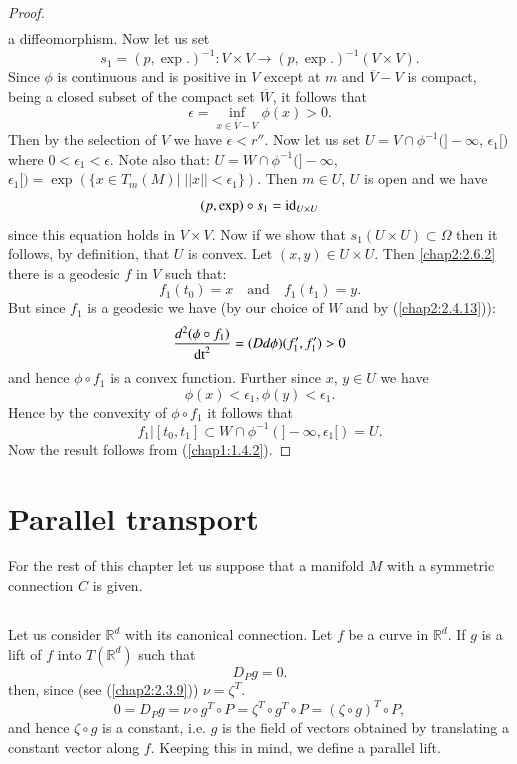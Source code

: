 \begin{proof}
\begin{align*}
\end{align*}
a diffeomorphism. Now let us set
$$
s_{1}=(p,\exp.)^{-1}:V\times V\to (p,\exp.)^{-1}(V\times V).
$$
Since $\phi$ is continuous and is positive in $V$ except at $m$ and
$\overline{V}-V$ is compact, being a closed subset of the compact set
$\overline{W}$, it follows that
$$
\epsilon=\inf_{x\in\overline{V}-V}\phi(x)>0.
$$
Then by the selection of $V$ we have $\epsilon<r''$. Now let us set
$U=V\cap \phi^{-1}(]-\infty$, $\epsilon_{1}[)$ where
    $0<\epsilon_{1}<\epsilon$. Note also that: $U=W\cap
    \phi^{-1}(]-\infty$, $\epsilon_{1}[)=\exp(\{x\in T_{m}(M)\big|\;
    ||x||<\epsilon_{1}\})$. Then $m\in U$, $U$ is open and we have
$$
(p,\exp)\circ s_{1}=\operatorname{id}_{U\times U}
$$
since \pageoriginale this equation holds in $V\times V$. Now if we show
that $s_{1}(U\times U)\subset \Omega$ then it follows, by definition,
that $U$ is convex. Let $(x,y)\in U\times U$. Then \ref{chap2:2.6.2} there
is a geodesic $f$ in $V$ such that:
$$
f_{1}(t_{0})=x\quad\text{and}\quad f_{1}(t_{1})=y.
$$
But since $f_{1}$ is a geodesic we have (by our choice of $W$ and by
(\ref{chap2:2.4.13})): 
$$
\dfrac{d^{2}(\phi\circ f_{1})}{\operatorname{dt}^{2}}=(Dd\phi)(f'_{1},f'_{1})>0
$$
and hence $\phi\circ f_{1}$ is a convex function. Further since $x$,
$y\in U$ we have
$$
\phi(x)<\epsilon_{1}, \phi(y)<\epsilon_{1}.
$$
Hence by the convexity of $\phi\circ f_{1}$ it follows that
$$
f_{1}\big|[t_{0},t_{1}]\subset W\cap
\phi^{-1}(]-\infty,\epsilon_{1}[)=U.
$$
Now the result follows from (\ref{chap1:1.4.2}).
\end{proof}

\section{Parallel transport}\label{chap2:sec7}

For the rest of this chapter let us suppose that a manifold $M$ with a
symmetric connection $C$ is given.

\subsection{}\label{chap2:exam2.7.1}


\begin{example*}
Let us consider $\mathbb{R}^{d}$ with its canonical connection. Let
$f$ be a curve in $\mathbb{R}^{d}$. If $g$ is a lift of $f$ into
$T(\mathbb{R}^{d})$ such that
$$
D_{P}g=0.
$$
then, \pageoriginale since (see (\ref{chap2:2.3.9})) $\nu=\zeta^{T}$.
$$
0=D_{P}g=\nu\circ g^{T}\circ P=\zeta^{T}\circ g^{T}\circ P=(\zeta\circ
g)^{T}\circ P,
$$
and hence $\zeta\circ g$ is a constant, i.e. $g$ is the field of
vectors obtained by translating a constant vector along $f$. Keeping
this in mind, we define a parallel lift.
\end{example*}

